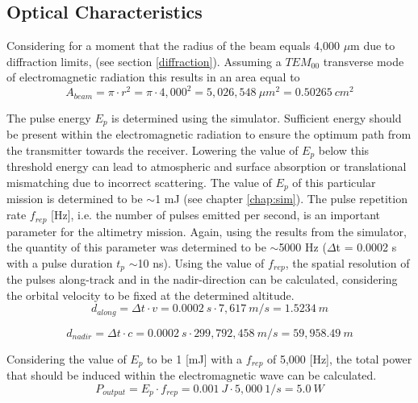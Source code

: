 \subsection{Optical Characteristics} 
\label{opticalchar}
Considering for a moment that the radius of the beam equals 4,000 $\mu$m due to diffraction limits, (see section \ref{diffraction}). Assuming a $TEM_{00}$ transverse mode of electromagnetic radiation this results in an area equal to 
\begin{equation}
\label{area}
A_{beam} = \pi \cdot r^{2} = \pi \cdot 4,000^{2} = 5,026,548\ \mu m^{2} = 0.50265\ cm^{2}
\end{equation}

The pulse energy $E_{p}$ is determined using the simulator. Sufficient energy should be present within the electromagnetic radiation to ensure the optimum path from the transmitter towards the receiver. Lowering the value of $E_{p}$ below this threshold energy can lead to atmospheric and surface absorption or translational mismatching due to incorrect scattering. The value of $E_{p}$ of this particular mission is determined to be $\sim$1 mJ (see chapter \ref{chap:sim}).
The pulse repetition rate $f_{rep}$ [Hz], i.e. the number of pulses emitted per second, is an important parameter for the altimetry mission. Again, using the results from the simulator, the quantity of this parameter was determined to be $\sim$5000 Hz ($\Delta$t = 0.0002 s with a pulse duration $t_{p}$ $\sim$10 ns). Using the value of $f_{rep}$, the spatial resolution of the pulses along-track and in the nadir-direction can be calculated, considering the orbital velocity to be fixed at the determined altitude.  
\begin{equation}
\label{alongtrackres}
d_{along} = \Delta t \cdot v = 0.0002\ s \cdot 7,617\ m/s = 1.5234\ m
\end{equation}

\begin{equation}
\label{alongtracknadir}
d_{nadir} = \Delta t \cdot c = 0.0002\ s \cdot 299,792,458\ m/s = 59,958.49\ m
\end{equation}

Considering the value of $E_{p}$ to be 1 [mJ] with a $f_{rep}$ of 5,000 [Hz], the total power that should be induced within the electromagnetic wave can be calculated.
\begin{equation}
\label{outputpower}
P_{output} = E_{p} \cdot f_{rep} = 0.001\ J \cdot 5,000\ 1/s = 5.0\ W
\end{equation}

